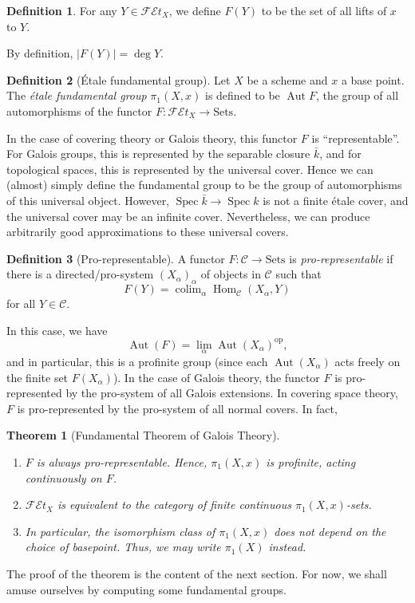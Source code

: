 \documentclass{shortart}
\newtheorem*{thm}{Theorem}
\theoremstyle{definition}
\newtheorem*{defi}{Definition}
\newcommand\op{\mathrm{op}}
\newcommand\FEt[1]{\mathscr{FE}t_{#1}}
\newcommand\Sets{\mathrm{Sets}}
\DeclareMathOperator\Spec{Spec}
\DeclareMathOperator\Aut{Aut}
\DeclareMathOperator\Hom{Hom}
\DeclareMathOperator*\colim{colim}
\begin{document}
\begin{defi}
  For any $Y \in \FEt{X}$, we define $F(Y)$ to be the set of all lifts of $x$ to $Y$.
\end{defi}
By definition, $|F(Y)| = \deg Y$.

\begin{defi}[\'Etale fundamental group]
  Let $X$ be a scheme and $x$ a base point. The \emph{\'etale fundamental group} $\pi_1(X, x)$ is defined to be $\Aut F$, the group of all automorphisms of the functor $F: \FEt{X} \to \Sets$.
\end{defi}
In the case of covering theory or Galois theory, this functor $F$ is ``representable''. For Galois groups, this is represented by the separable closure $\bar{k}$, and for topological spaces, this is represented by the universal cover. Hence we can (almost) simply define the fundamental group to be the group of automorphisms of this universal object. However, $\Spec \bar{k} \to \Spec k$ is not a finite \'etale cover, and the universal cover may be an infinite cover. Nevertheless, we can produce arbitrarily good approximations to these universal covers.

\begin{defi}[Pro-representable]
  A functor $F: \mathcal{C} \to \Sets$ is \emph{pro-representable} if there is a directed/pro-system $(X_\alpha)_\alpha$ of objects in $\mathcal{C}$ such that
  \[
    F(Y) = \colim_\alpha \Hom_{\mathcal{C}}(X_\alpha, Y)
  \]
  for all $Y \in \mathcal{C}$.
\end{defi}

In this case, we have
\[
  \Aut(F) = \lim_\alpha \Aut(X_\alpha)^\op,
\]
and in particular, this is a profinite group (since each $\Aut(X_\alpha)$ acts freely on the finite set $F(X_\alpha)$). In the case of Galois theory, the functor $F$ is pro-represented by the pro-system of all Galois extensions. In covering space theory, $F$ is pro-represented by the pro-system of all normal covers. In fact,
\begin{thm}[Fundamental Theorem of Galois Theory]\leavevmode
  \begin{enumerate}
    \item $F$ is always pro-representable. Hence, $\pi_1(X, x)$ is profinite, acting continuously on $F$.
    \item $\FEt{X}$ is equivalent to the category of finite continuous $\pi_1(X, x)$-sets.
    \item In particular, the isomorphism class of $\pi_1(X, x)$ does not depend on the choice of basepoint. Thus, we may write $\pi_1(X)$ instead.
  \end{enumerate}
\end{thm}
The proof of the theorem is the content of the next section. For now, we shall amuse ourselves by computing some fundamental groups.
\end{document}
